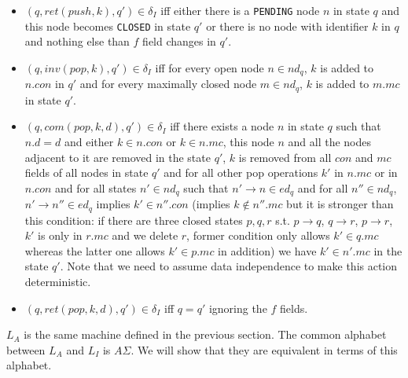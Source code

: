 \begin{itemize}
\begin{itemize}
\item $(q, ret(push,k),q') \in \delta_I$ iff either there is a \texttt{PENDING} node $n$ in state $q$ and this node becomes \texttt{CLOSED} in state $q'$ or there is no node with identifier $k$ in $q$ and nothing else than $f$ field changes in $q'$.
\item $(q, inv(pop,k),q') \in \delta_I$ iff for every open node $n \in nd_q$, $k$ is added to $n.con$ in $q'$ and for every maximally closed node $m \in nd_q$, $k$ is added to $m.mc$ in state $q'$. 
\item $(q, com(pop,k,d), q') \in \delta_I$ iff there exists a node $n$ in state $q$ such that $n.d = d$ and either $k \in n.con$ or $k \in n.mc$, this node $n$ and all the nodes adjacent to it are removed in the state $q'$, $k$ is removed from all $con$ and $mc$ fields of all nodes in state $q'$ and for all other pop operations $k'$ in $n.mc$ or in $n.con$ and for all states $n' \in nd_q$ such that $n' \rightarrow n \in ed_q$ and for all $n'' \in nd_q$, $n' \rightarrow n'' \in ed_q$ implies $k' \in n''.con$ (implies $k \notin n''.mc$ but it is stronger than this condition: if there are three closed states $p,q,r$ s.t. $p \rightarrow q$, $q \rightarrow r$, $p \rightarrow r$, $k'$ is only in $r.mc$ and we delete $r$, former condition only allows $k' \in q.mc$ whereas the latter one allows $k' \in p.mc$ in addition) we have $k' \in n'.mc$ in the state $q'$. Note that we need to assume data independence to make this action deterministic.
\item $(q, ret(pop,k,d), q') \in \delta_I$ iff $q=q'$ ignoring the $f$ fields.
\end{itemize}
\end{itemize}
$L_A$ is the same machine defined in the previous section. The common alphabet between $L_A$ and $L_I$ is $A\Sigma$. We will show that they are equivalent in terms of this alphabet.

